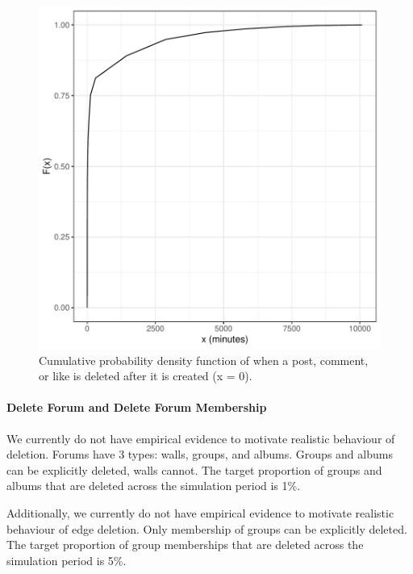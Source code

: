 \begin{figure}[H]
  \centering
  \includegraphics[scale=\yedscale]{figures/fig-when-activity}
  \caption{Cumulative probability density function of when a post, comment, or like is deleted after it is created (x = 0).}
  \label{fig:when-activity}
\end{figure}


\paragraph{Delete Forum and Delete Forum Membership}

We currently do not have empirical evidence to motivate realistic behaviour of \tForum deletion.
Forums have 3 types: walls, groups, and albums.
Groups and albums can be explicitly deleted, walls cannot.
The target proportion of groups and albums that are deleted across the simulation period is 1\%.

Additionally, we currently do not have empirical evidence to motivate realistic behaviour of \tHasMember edge deletion.
Only membership of groups can be explicitly deleted.
The target proportion of group memberships that are deleted across the simulation period is 5\%.


